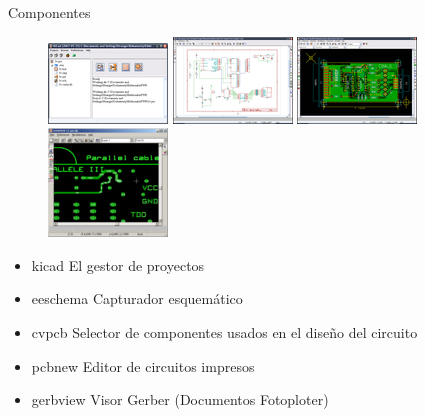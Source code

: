 \documentclass{beamer}
\begin{document}
\begin{frame}{Componentes}
  \begin{figure}[!h]
    \centering
    \includegraphics[scale=0.6]{img/kicad-project.png}
    \includegraphics[scale=0.5]{img/eeschema.png}
    \includegraphics[scale=0.5]{img/pcbnew.png}
    \includegraphics[scale=0.4]{img/gerbview.png}
  \end{figure}
  \begin{itemize}
  \item \alert{kicad} El gestor de proyectos
  \item \alert{eeschema} Capturador esquemático
  \item \alert{cvpcb} Selector de componentes usados en el diseño del circuito
  \item \alert{pcbnew} Editor de circuitos impresos
  \item \alert{gerbview} Visor Gerber (Documentos Fotoploter)
  \end{itemize}
\end{frame}

\end{document}
